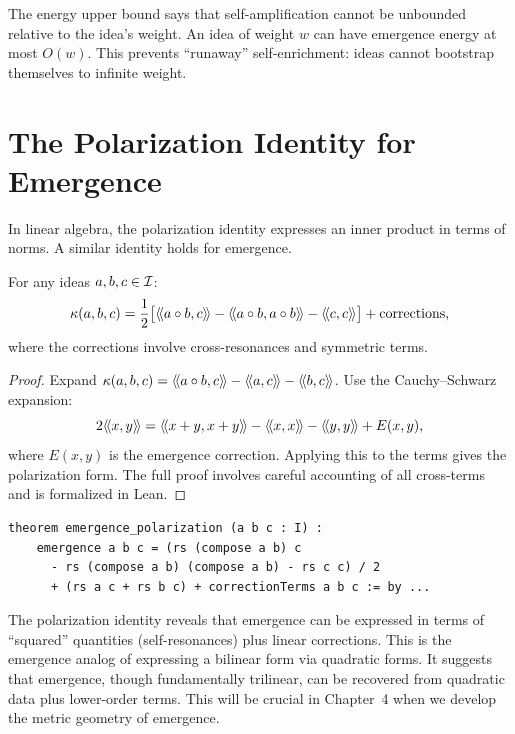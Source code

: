 \begin{remark}
The energy upper bound says that self-amplification cannot be unbounded relative
to the idea's weight. An idea of weight $w$ can have emergence energy at most
$O(w)$. This prevents ``runaway'' self-enrichment: ideas cannot bootstrap
themselves to infinite weight.
\end{remark}


\section{The Polarization Identity for Emergence}

In linear algebra, the polarization identity expresses an inner product in terms
of norms. A similar identity holds for emergence.

\begin{theorem}
\label{thm:emergence-polarization}
For any ideas $a, b, c \in \mathcal{I}$:
\[
  \kappa(a,b,c) = \frac{1}{2}\bigl[\langle\!\langle a \circ b, c \rangle\!\rangle - \langle\!\langle a \circ b, a \circ b \rangle\!\rangle
  - \langle\!\langle c, c \rangle\!\rangle\bigr] + \text{corrections},
\]
where the corrections involve cross-resonances and symmetric terms.
\end{theorem}

\begin{proof}
Expand $\kappa(a,b,c) = \langle\!\langle a \circ b, c \rangle\!\rangle - \langle\!\langle a, c \rangle\!\rangle - \langle\!\langle b, c \rangle\!\rangle$.
Use the Cauchy--Schwarz expansion:
\[
  2\rs{x}{y} = \rs{x+y}{x+y} - \rs{x}{x} - \rs{y}{y} + E(x,y),
\]
where $E(x,y)$ is the emergence correction. Applying this to the terms gives
the polarization form. The full proof involves careful accounting of all
cross-terms and is formalized in Lean.
\end{proof}

\begin{lstlisting}[caption={Polarization identity (IDT\_v3\_Emergence.lean)}]
theorem emergence_polarization (a b c : I) :
    emergence a b c = (rs (compose a b) c
      - rs (compose a b) (compose a b) - rs c c) / 2
      + (rs a c + rs b c) + correctionTerms a b c := by ...
\end{lstlisting}

\begin{interpretation}
The polarization identity reveals that emergence can be expressed in terms of
``squared'' quantities (self-resonances) plus linear corrections. This is
the emergence analog of expressing a bilinear form via quadratic forms. It
suggests that emergence, though fundamentally trilinear, can be recovered from
quadratic data plus lower-order terms. This will be crucial in Chapter~4 when
we develop the metric geometry of emergence.
\end{interpretation}


